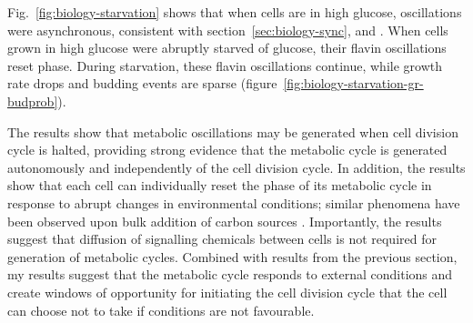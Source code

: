 Fig.\ \ref{fig:biology-starvation} shows that when cells are in high glucose, oscillations were asynchronous, consistent with section~\ref{sec:biology-sync}, \textcite{papagiannakisAutonomousMetabolicOscillations2017} and \textcite{baumgartnerFlavinbasedMetabolicCycles2018}.
When cells grown in high glucose were abruptly starved of glucose, their flavin oscillations reset phase.
During starvation, these flavin oscillations continue, while growth rate drops and budding events are sparse (figure~\ref{fig:biology-starvation-gr-budprob}).

The results show that metabolic oscillations may be generated when cell division cycle is halted, providing strong evidence that the metabolic cycle is generated autonomously and independently of the cell division cycle.
In addition, the results show that each cell can individually reset the phase of its metabolic cycle in response to abrupt changes in environmental conditions; similar phenomena have been observed upon bulk addition of carbon sources \parencite{kuangMsn2RegulateExpression2017, krishnaMinimalPushPull2018}.
Importantly, the results suggest that diffusion of signalling chemicals between cells is not required for generation of metabolic cycles.
Combined with results from the previous section, my results suggest that the metabolic cycle responds to external conditions and create windows of opportunity for initiating the cell division cycle that the cell can choose not to take if conditions are not favourable.


